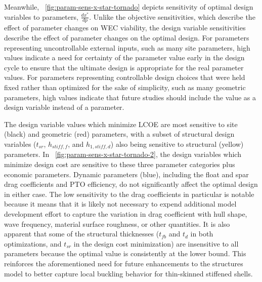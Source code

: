 Meanwhile, \figureautorefname~\ref{fig:param-sens-x-star-tornado} depicts sensitivity of optimal design variables to parameters, $\frac{dx^*}{dp}$. 
Unlike the objective sensitivities, which describe the effect of parameter changes on WEC viability, the design variable sensitivities describe the effect of parameter changes on the optimal design. 
For parameters representing uncontrollable external inputs, such as many site parameters, high values indicate a need for certainty of the parameter value early in the design cycle to ensure that the ultimate design is appropriate for the real parameter values.
For parameters representing controllable design choices that were held fixed rather than optimized for the sake of simplicity, such as many geometric parameters, high values indicate that future studies should include the value as a design variable instead of a parameter.

The design variable values which minimize LCOE are most sensitive to site (black) and geometric (red) parameters, with a subset of structural design variables ($t_{sr}$, $h_{stiff,f}$, and $h_{1,stiff,d}$) also being sensitive to structural (yellow) parameters.
In \figureautorefname~\ref{fig:param-sens-x-star-tornado-2}, the design variables which minimize design cost are sensitive to these three parameter categories plus economic parameters.
Dynamic parameters (blue), including the float and spar drag coefficients and PTO efficiency, do not significantly affect the optimal design in either case.
The low sensitivity to the drag coefficients in particular is notable because it means that it is likely not necessary to expend additional model development effort to capture the variation in drag coefficient with hull shape, wave frequency, material surface roughness, or other quantities.
It is also apparent that some of the structural thicknesses ($t_{fb}$ and $t_d$ in both optimizations, and $t_{sr}$ in the design cost minimization) are insensitive to all parameters because the optimal value is consistently at the lower bound.
This reinforces the aforementioned need for future enhancements to the structures model to better capture local buckling behavior for thin-skinned stiffened shells.

